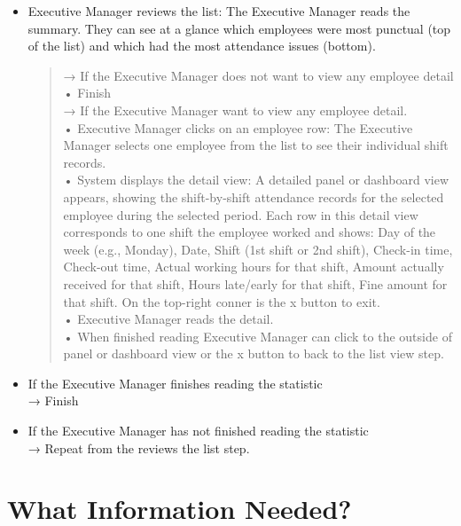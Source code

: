 \begin{itemize}
\begin{itemize}
\begin{itemize}
\begin{itemize}
                \item Executive Manager reviews the list: The Executive Manager reads the summary. They can see at a glance which employees were most punctual (top of the list) and which had the most attendance issues (bottom).
                \begin{quote}
                    → If the Executive Manager does not want to view any employee detail\\
                    • Finish\\
                    → If the Executive Manager want to view any employee detail.\\
                    • Executive Manager clicks on an employee row: The Executive Manager selects one employee from the list to see their individual shift records.\\
                    • System displays the detail view: A detailed panel or dashboard view appears, showing the shift-by-shift attendance records for the selected employee during the selected period. Each row in this detail view corresponds to one shift the employee worked and shows: Day of the week (e.g., Monday), Date, Shift (1st shift or 2nd shift), Check-in time, Check-out time, Actual working hours for that shift, Amount actually received for that shift, Hours late/early for that shift, Fine amount for that shift. On the top-right conner is the x button to exit.\\
                    • Executive Manager reads the detail.\\
                    • When finished reading Executive Manager can click to the outside of panel or dashboard view or the x button to back to the list view step.
                \end{quote}
                \item If the Executive Manager finishes reading the statistic\\
                → Finish
                \item If the Executive Manager has not finished reading the statistic\\
                → Repeat from the reviews the list step.
            \end{itemize}
        \end{itemize}
    \end{itemize}
\end{itemize}

\section{What Information Needed?}


